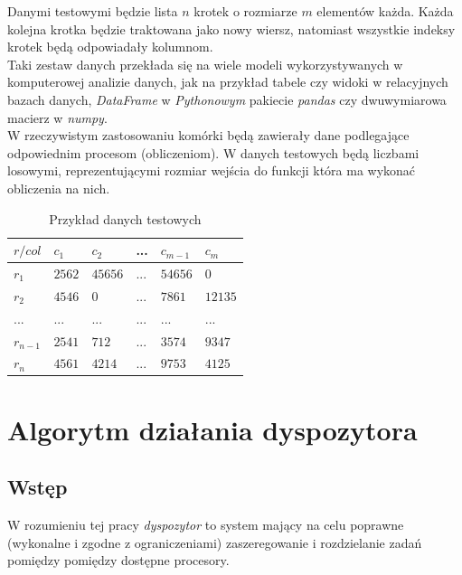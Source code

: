 \documentclass[brudnopis]{xmgr}
\begin{document}
Danymi testowymi będzie lista $n$ krotek o rozmiarze $m$ elementów każda.
Każda kolejna krotka będzie traktowana jako nowy wiersz, natomiast wszystkie indeksy krotek będą odpowiadały kolumnom. 
\medskip\\

Taki zestaw danych przekłada się na wiele modeli wykorzystywanych w komputerowej analizie danych, jak na przykład tabele czy widoki w relacyjnych bazach danych, \emph{DataFrame} w \emph{Pythonowym} pakiecie \emph{pandas} czy dwuwymiarowa macierz w \emph{numpy}.
\medskip\\

W rzeczywistym zastosowaniu komórki będą zawierały dane podlegające odpowiednim procesom (obliczeniom).
W danych testowych będą liczbami losowymi, reprezentującymi rozmiar wejścia do funkcji która ma wykonać obliczenia na nich.
\medskip\\

\begin{table}[!tbh]
\begin{tabular}{|l|l|l|l|l|l|} \hline
$r / col$   & $c_1$     & $c_2$     & ...   & $c_{m-1}$ & $c_{m}$   \\ \hline
$r_1$       & $2562$    & $45656$   & ...   & $54656$   & $0$       \\ \hline
$r_2$       & $4546$    & $0$       & ...   & $7861$    & $12135$   \\ \hline
$...$       & $...$     & $...$     & $...$ & $...$     & $...$     \\ \hline
$r_{n-1}$   & $2541$   & $712$      & ...   & $3574$    & $9347$    \\ \hline
$r_{n}$     & $4561$   & $4214$     & ...   & $9753$    & $4125$    \\ \hline
\end{tabular}
\caption{Przykład danych testowych\label{tab:example-sched-out}}
\end{table}

\chapter{Algorytm działania dyspozytora}

\section{Wstęp}

W rozumieniu tej pracy \emph{dyspozytor} to system mający na celu poprawne (wykonalne i zgodne z ograniczeniami) zaszeregowanie i rozdzielanie zadań pomiędzy pomiędzy dostępne procesory.
\medskip\\
\end{document}
